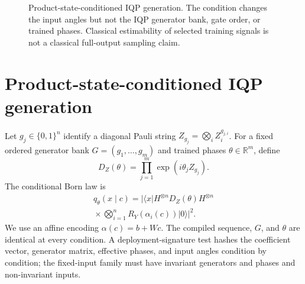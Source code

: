 \documentclass[a4paper,twocolumn,11pt,unpublished]{quantumarticle}
\newcommand{\bits}{\{0,1\}}
\begin{document}
\begin{figure}[t]
\centering
{}
\caption{Product-state-conditioned IQP generation.  The condition changes the
input angles but not the IQP generator bank, gate order, or trained phases.
Classical estimability of selected training signals is not a classical
full-output sampling claim.}
\label{fig:pipeline}
\end{figure}

\section{Product-state-conditioned IQP generation}
\label{sec:model}

Let $g_j\in\bits^n$ identify a diagonal Pauli string
$Z_{g_j}=\bigotimes_i Z_i^{g_{j,i}}$.  For a fixed ordered generator bank
$G=(g_1,\ldots,g_m)$ and trained phases $\theta\in\mathbb R^m$, define
\begin{equation}
 D_Z(\theta)=\prod_{j=1}^{m}\exp(i\theta_j Z_{g_j}).
\end{equation}
The conditional Born law is
\begin{equation}
 \begin{split}
 q_\theta(x\mid c)=\bigg|\langle x|H^{\otimes n}D_Z(\theta)H^{\otimes n}\\
 {}\times\bigotimes_{i=1}^{n}R_Y(\alpha_i(c))|0\rangle\bigg|^2.
 \end{split}
 \label{eq:model}
\end{equation}
We use an affine encoding $\alpha(c)=b+Wc$.  The compiled sequence, $G$, and
$\theta$ are identical at every condition.  A deployment-signature test hashes
the coefficient vector, generator matrix, effective phases, and input angles
condition by condition; the fixed-input family must have invariant generators
and phases and non-invariant inputs.
\end{document}

